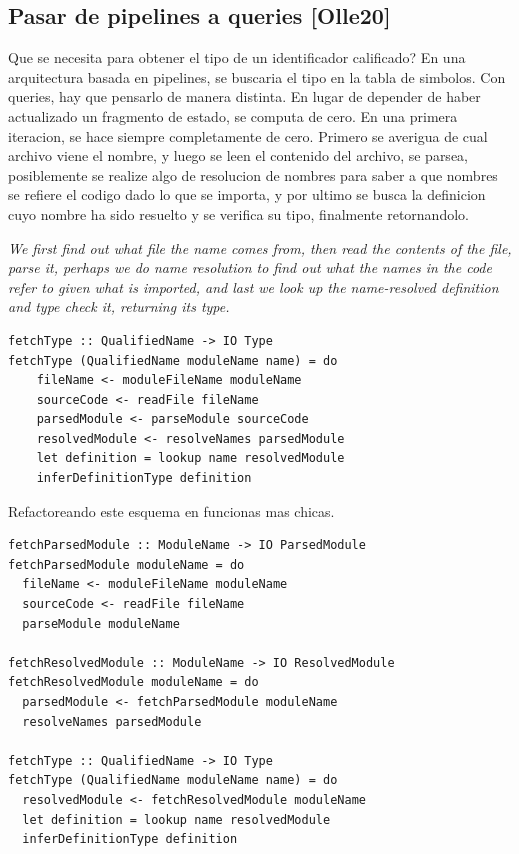 \documentclass[12pt, a4paper]{report}
\begin{document}
\subsection*{Pasar de pipelines a queries [Olle20]}

Que se necesita para obtener el tipo de un identificador calificado?
En una arquitectura basada en pipelines, se buscaria el tipo en la tabla de simbolos.
Con queries, hay que pensarlo de manera distinta.
En lugar de depender de haber actualizado un fragmento de estado, se computa de cero.
En una primera iteracion, se hace siempre completamente de cero.
Primero se averigua de cual archivo viene el nombre, y luego se leen el contenido del archivo, se parsea, posiblemente se realize algo de resolucion de nombres para saber a que nombres se refiere el codigo dado lo que se importa, y por ultimo se busca la definicion cuyo nombre ha sido resuelto y se verifica su tipo, finalmente retornandolo.

\textit{We first find out what file the name comes from, then read the contents of the file, parse it, perhaps we do name resolution to find out what the names in the code refer to given what is imported, and last we look up the name-resolved definition and type check it, returning its type.}

\begin{verbatim}
fetchType :: QualifiedName -> IO Type
fetchType (QualifiedName moduleName name) = do
    fileName <- moduleFileName moduleName
    sourceCode <- readFile fileName
    parsedModule <- parseModule sourceCode
    resolvedModule <- resolveNames parsedModule
    let definition = lookup name resolvedModule
    inferDefinitionType definition
\end{verbatim}

Refactoreando este esquema en funcionas mas chicas.

\begin{verbatim}
fetchParsedModule :: ModuleName -> IO ParsedModule
fetchParsedModule moduleName = do
  fileName <- moduleFileName moduleName
  sourceCode <- readFile fileName
  parseModule moduleName

fetchResolvedModule :: ModuleName -> IO ResolvedModule
fetchResolvedModule moduleName = do
  parsedModule <- fetchParsedModule moduleName
  resolveNames parsedModule

fetchType :: QualifiedName -> IO Type
fetchType (QualifiedName moduleName name) = do
  resolvedModule <- fetchResolvedModule moduleName
  let definition = lookup name resolvedModule
  inferDefinitionType definition
\end{verbatim}
\end{document}
